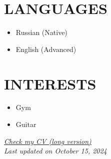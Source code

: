 \documentclass[11pt,a4paper]{moderncv}
\newcommand*{\scoreentry}[3][2.5mm]{
    {\bfseries #2} \\
    {\itshape #3}
    \par\addvspace{#1}
}
\begin{document}
\begin{minipage}[t]{0.35\textwidth}

\section{LANGUAGES}
\begin{itemize}
    \item Russian (Native)
    \item English (Advanced)
\end{itemize}

\section{INTERESTS}
\begin{itemize}
    \item Gym
    \item Guitar
\end{itemize}
\end{minipage}

\vspace*{\fill}
\begin{center}
\textit{\href{https://latexonline.cc/compile?git=https://github.com/kisnikser/CV&target=cv.tex&command=xelatex&force=true}{Check my CV (long version)}}\\
\textit{Last updated on October 15, 2024}
\end{center}
\vspace{-0.5cm}
\end{document}
